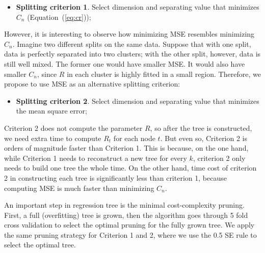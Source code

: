 \vspace{-0.05in}
\begin{itemize}
\item \textbf{Splitting criterion 1}. Select dimension and separating value that minimizes $C_n$ (Equation~(\ref{eq:cr})); 
\end{itemize}
\vspace{-0.05in}

However, it is interesting to observe how minimizing MSE resembles minimizing $C_n$. Imagine two different splits on the same data. Suppose that with one split, data is perfectly separated into two clusters; with the other split, however, data is still well mixed. The former one would have smaller MSE. It would also have smaller $C_n$, since $R$ in each cluster is highly fitted in a small region. Therefore, we propose to use MSE as an alternative splitting criterion:

\vspace{-0.05in}
\begin{itemize}
\item \textbf{Splitting criterion 2}. Select dimension and separating value that minimizes the mean square error; 
\end{itemize}
\vspace{-0.05in}

Criterion 2 does not compute the parameter $R$, so after the tree is constructed, we need extra time to compute $R_t$ for each node $t$. But even so, Criterion 2 is orders of magnitude faster than Criterion 1. This is because, on the one hand, while Criterion 1 needs to reconstruct a new tree for every $k$, criterion 2 only needs to build one tree the whole time. On the other hand, time cost of criterion 2 in constructing each tree is significantly less than criterion 1, because computing MSE is much faster than minimizing $C_n$. 

An important step in regression tree \cite{BreimanEtAl:84} is the minimal cost-complexity pruning. First, a full (overfitting) tree is grown, then the algorithm goes through 5 fold cross validation to select the optimal pruning for the fully grown tree. We apply the same pruning strategy for Criterion 1 and 2, where we use the 0.5 SE rule to select the optimal tree. 

